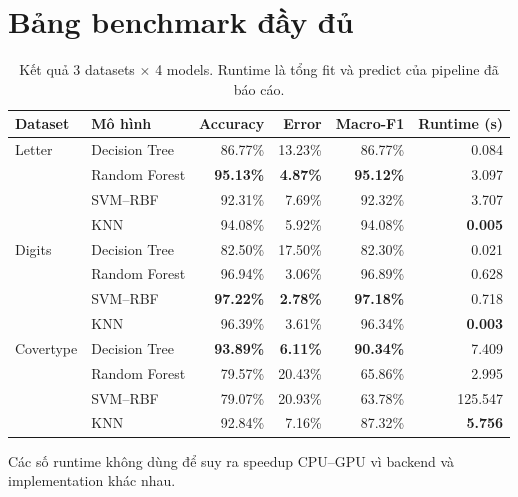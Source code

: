 \appendix

\chapter{Bảng benchmark đầy đủ}
\label{app:full-benchmark}

\begin{table}[H]
    \centering
    \footnotesize
    \caption[Benchmark đầy đủ: 3 datasets $\times$ 4 models]{Kết quả 3 datasets $\times$ 4 models. Runtime là tổng fit và predict của pipeline đã báo cáo.}
    \label{tab:full-model-benchmark}
    \begin{tabular*}{\textwidth}{@{\extracolsep{\fill}}llrrrr@{}}
        \toprule
        \textbf{Dataset} & \textbf{Mô hình} & \textbf{Accuracy} & \textbf{Error} & \textbf{Macro-F1} & \textbf{Runtime (s)} \\
        \midrule
        Letter & Decision Tree & 86.77\% & 13.23\% & 86.77\% & 0.084 \\
               & Random Forest & \textbf{95.13\%} & \textbf{4.87\%} & \textbf{95.12\%} & 3.097 \\
               & SVM--RBF & 92.31\% & 7.69\% & 92.32\% & 3.707 \\
               & KNN & 94.08\% & 5.92\% & 94.08\% & \textbf{0.005} \\
        \addlinespace
        Digits & Decision Tree & 82.50\% & 17.50\% & 82.30\% & 0.021 \\
               & Random Forest & 96.94\% & 3.06\% & 96.89\% & 0.628 \\
               & SVM--RBF & \textbf{97.22\%} & \textbf{2.78\%} & \textbf{97.18\%} & 0.718 \\
               & KNN & 96.39\% & 3.61\% & 96.34\% & \textbf{0.003} \\
        \addlinespace
        Covertype & Decision Tree & \textbf{93.89\%} & \textbf{6.11\%} & \textbf{90.34\%} & 7.409 \\
                  & Random Forest & 79.57\% & 20.43\% & 65.86\% & 2.995 \\
                  & SVM--RBF & 79.07\% & 20.93\% & 63.78\% & 125.547 \\
                  & KNN & 92.84\% & 7.16\% & 87.32\% & \textbf{5.756} \\
        \bottomrule
    \end{tabular*}
\end{table}

Các số runtime không dùng để suy ra speedup CPU--GPU vì backend và implementation khác nhau.

